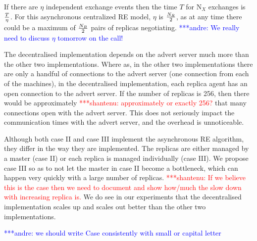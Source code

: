 \documentclass{rspublic}
\newcommand{\jhanote}[1]{ {\textcolor{red} { ***shantenu: #1 }}}
\newcommand{\alnote}[1]{ {\textcolor{blue} { ***andre: #1 }}}
\newcommand{\alnote}[1]{}
\newcommand{\jhanote}[1]{}
\begin{document}
If there are $\eta$ independent exchange events then the time $T$ for
N$_X$ exchanges is $T \over \eta$. For this asynchronous centralized
RE model, $\eta$ is $N_R \over 2$, as at any time there could be a
maximum of $N_R \over 2$ pairs of replicas negotiating.  \alnote{We
  really need to discuss $\eta$ tomorrow on the call!}


The decentralised implementation depends on the advert server much
more than the other two implementations. Where as, in the other two
implementations there are only a handful of connections to the advert
server (one connection from each of the machines), in the
decentralised implementation, each replica agent has an open
connection to the advert server. If the number of replicas is 256,
then there would be approximately \jhanote{approximately or exactly
  256?} that many connections open with the advert server. This does
not seriously impact the communication times with the advert server,
and the overhead is unnoticeable.

Although both case II and case III implement the asynchronous RE
algorithm, they differ in the way they are implemented. The replicas
are either managed by a master (case II) or each replica is managed
individually (case III). We propose case III so as to not let the
master in case II become a bottleneck, which can happen very quickly
with a large number of replicas. \jhanote{If we believe this is the
  case then we need to document and show how/much the slow down with
  increasing replica is.} We do see in our experiments that the
decentralised implementation scales up and scales out better than the
other two implementations.


\alnote{we should write Case consistently with small or capital letter}
\end{document}

